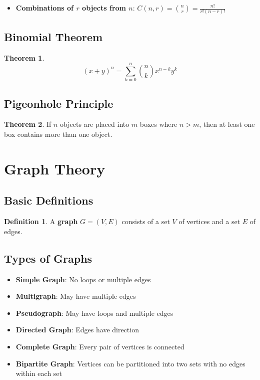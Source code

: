 \documentclass[11pt]{article}
\theoremstyle{definition}
\newtheorem{definition}{Definition}[section]
\newtheorem{theorem}{Theorem}[section]
\begin{document}
\begin{itemize}
    \item \textbf{Combinations of $r$ objects from $n$}: $C(n,r) = \binom{n}{r} = \frac{n!}{r!(n-r)!}$
\end{itemize}

\subsection{Binomial Theorem}
\begin{theorem}
$$(x + y)^n = \sum_{k=0}^{n} \binom{n}{k} x^{n-k} y^k$$
\end{theorem}

\subsection{Pigeonhole Principle}
\begin{theorem}
If $n$ objects are placed into $m$ boxes where $n > m$, then at least one box contains more than one object.
\end{theorem}

\section{Graph Theory}

\subsection{Basic Definitions}
\begin{definition}
A \textbf{graph} $G = (V, E)$ consists of a set $V$ of vertices and a set $E$ of edges.
\end{definition}

\subsection{Types of Graphs}
\begin{itemize}
    \item \textbf{Simple Graph}: No loops or multiple edges
    \item \textbf{Multigraph}: May have multiple edges
    \item \textbf{Pseudograph}: May have loops and multiple edges
    \item \textbf{Directed Graph}: Edges have direction
    \item \textbf{Complete Graph}: Every pair of vertices is connected
    \item \textbf{Bipartite Graph}: Vertices can be partitioned into two sets with no edges within each set
\end{itemize}
\end{document}
